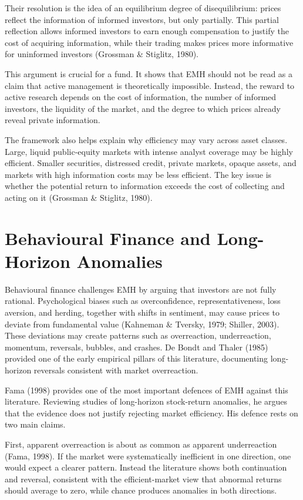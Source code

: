 \documentclass[11pt,a4paper]{article}
\begin{document}
Their resolution is the idea of an equilibrium degree of disequilibrium: prices reflect the information of informed investors, but only partially. This partial reflection allows informed investors to earn enough compensation to justify the cost of acquiring information, while their trading makes prices more informative for uninformed investors (Grossman \& Stiglitz, 1980).

This argument is crucial for a fund. It shows that EMH should not be read as a claim that active management is theoretically impossible. Instead, the reward to active research depends on the cost of information, the number of informed investors, the liquidity of the market, and the degree to which prices already reveal private information.

The framework also helps explain why efficiency may vary across asset classes. Large, liquid public-equity markets with intense analyst coverage may be highly efficient. Smaller securities, distressed credit, private markets, opaque assets, and markets with high information costs may be less efficient. The key issue is whether the potential return to information exceeds the cost of collecting and acting on it (Grossman \& Stiglitz, 1980).

\section{Behavioural Finance and Long-Horizon Anomalies}

Behavioural finance challenges EMH by arguing that investors are not fully rational. Psychological biases such as overconfidence, representativeness, loss aversion, and herding, together with shifts in sentiment, may cause prices to deviate from fundamental value (Kahneman \& Tversky, 1979; Shiller, 2003). These deviations may create patterns such as overreaction, underreaction, momentum, reversals, bubbles, and crashes. De Bondt and Thaler (1985) provided one of the early empirical pillars of this literature, documenting long-horizon reversals consistent with market overreaction.

Fama (1998) provides one of the most important defences of EMH against this literature. Reviewing studies of long-horizon stock-return anomalies, he argues that the evidence does not justify rejecting market efficiency. His defence rests on two main claims.

First, apparent overreaction is about as common as apparent underreaction (Fama, 1998). If the market were systematically inefficient in one direction, one would expect a clearer pattern. Instead the literature shows both continuation and reversal, consistent with the efficient-market view that abnormal returns should average to zero, while chance produces anomalies in both directions.
\end{document}
